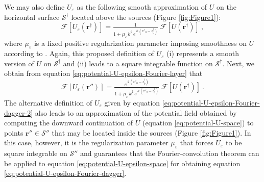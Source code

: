 \documentclass[manuscript,noblind]{geophysics}
\begin{document}
	We may also define $U_{\varepsilon}$ as the following smooth approximation of $U$ on the horizontal surface 
	$\mathcal{S}^{\dagger}$ located above the sources (Figure \ref{fig:Figure1}):
	\begin{equation}
		\mathcal{F} [ U_{\varepsilon}(\mathbf{r}^{\dagger}) ] = 
		\tfrac{1}{1 + \mu_{\varepsilon} \, k^{2} \, e^{\, k \, (z''_{0} - z^{\dagger}_{0})}} \; 
		\mathcal{F} [ U(\mathbf{r}^{\dagger}) ] \: ,
		\label{eq:potential-U-epsilon-Fourier-dagger-2}
	\end{equation}
	where $\mu_{\varepsilon}$ is a fixed positive regularization parameter imposing smoothness on $U$ 
	according to \citet{pasteka_etal2012}. 
	Again, this proposed definition of $U_{\varepsilon}$ 
	(i) represents a smooth version of $U$ on $\mathcal{S}^{\dagger}$ and
	(ii) leads to a square integrable function on $\mathcal{S}^{\dagger}$.
	Next, we obtain from equation \ref{eq:potential-U-epsilon-Fourier-layer} that 
	\begin{equation}
		\mathcal{F} \left[ U_{\varepsilon}(\mathbf{r}'') \right] = 
		\tfrac{e^{\, k \, (z''_{0} - z^{\dagger}_{0})}}{1 + \mu_{\varepsilon} \, k^{2} \, e^{\, k \, (z''_{0} - z^{\dagger}_{0})}} \; 
		\mathcal{F} [ U(\mathbf{r}^{\dagger}) ] \: .
		\label{eq:potential-U-epsilon-Fourier-layer-2}
	\end{equation}
	The alternative definition of $U_{\varepsilon}$ given by equation \ref{eq:potential-U-epsilon-Fourier-dagger-2} 
	also leads to an approximation of the potential field obtained by 
	computing the downward continuation of $U$ (equation \ref{eq:potential-U-space}) 
	to points $\mathbf{r}'' \in \mathcal{S}''$ that may be located inside the sources (Figure \ref{fig:Figure1}). 
	In this case, however, it is the regularization parameter $\mu_{\varepsilon}$ that forces  
	$U_{\varepsilon}$ to be square integrable on $\mathcal{S}''$ and guarantees that the 
	Fourier-convolution theorem can be applied to equation \ref{eq:potential-U-epsilon-space} 
	for obtaining equation \ref{eq:potential-U-epsilon-Fourier-dagger}.
	
\end{document}
